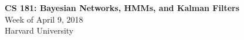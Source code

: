 \documentclass[12pt]{article}
\begin{document}
\singlespacing

\begin{center}
{\Large\textbf{CS 181: Bayesian Networks, HMMs, and Kalman Filters}} \\
\vspace{.5cm}
{\large Week of April 9, 2018 \\
 Harvard University}
\end{center}
\vspace{.5cm}

%
%
%
%
%
%
%		
\end{document}
